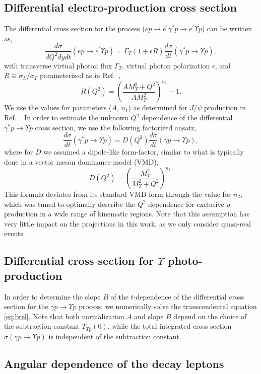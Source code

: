 \documentclass[prd,amsmath,%
twocolumn,floatfix,amssymb, preprintnumbers, linenumbers,nofootinbib, superscriptaddress]{revtex4}
\newcommand{\beq}{\begin{equation}}
\newcommand{\eeq}{\end{equation}}
\begin{document}
\subsection{Differential electro-production cross section}

The differential cross section for the process ($e p \to e^\prime \gamma^* p \to e^\prime \Upsilon p$) can be written as,
\beq
\frac{d\sigma}{dQ^2dydt}(e p \to e^\prime \Upsilon p) = 
\Gamma_T(1+\epsilon R)
\frac{d\sigma}{dt}(\gamma^* p \to \Upsilon p),
\eeq
with transverse virtual photon flux $\Gamma_T$, virtual photon polarization $\epsilon$, and 
$R\equiv\sigma_L/\sigma_T$ parameterized as in Ref.~\cite{Martynov:2002ez},
\beq
R(Q^2) = \left(\frac{A M_\Upsilon^2 + Q^2}{A M_\Upsilon^2}\right)^{n_1} - 1.
\eeq
We use the values for parameters ($A$, $n_1$) as determined for $J/\psi$ production in Ref.~\cite{Fiore:2009xk}.
In order to estimate the unknown $Q^2$ dependence of the differential $\gamma^* p \to \Upsilon p$ cross section, we use the following factorized ansatz,
\beq
\frac{d\sigma}{dt}(\gamma^* p \to \Upsilon p) = D(Q^2) \frac{d\sigma}{dt}(\gamma p \to \Upsilon p),
\eeq
where for $D$ we assumed a dipole-like form-factor, similar to what is typically
done in a vector meson dominance model (VMD),
\beq
D(Q^2) = \left(\frac{M_\Upsilon^2}{M_\Upsilon^2 + Q^2}\right)^{n_2}.
\eeq
This formula deviates from its standard VMD form through the value for $n_2$, which was
tuned to optimally describe the $Q^2$ dependence for exclusive $\rho$ production in a wide range
of kinematic regions.
Note that this assumption has very little impact on the projections in this work, as we only consider quasi-real events.

\subsection{Differential cross section for $\Upsilon$ photo-production}

In order to determine the slope $B$ of the $t$-dependence of the differential cross section for 
the $\gamma p \to \Upsilon p$ process, we numerically solve the transcendental equation \eqref{eq:brel}.
Note that both  normalization $A$ and slope $B$ depend on the choice of the subtraction
constant $T_{\Upsilon p} (0)$, while the total integrated cross section 
$\sigma(\gamma p \to \Upsilon p)$ is independent of the subtraction constant.

\subsection{Angular dependence of the decay leptons}
\end{document}

